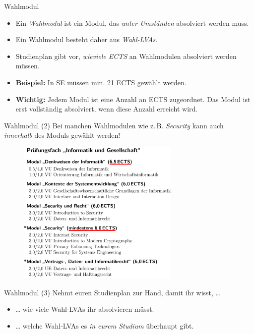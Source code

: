 \documentclass{beamer}
\begin{document}
\begin{frame}{Wahlmodul}
    \begin{itemize}
        \item Ein \textit{Wahlmodul} ist ein Modul, das
              \textit{unter Umständen} absolviert werden muss.
        \item Ein Wahlmodul besteht daher aus \textit{Wahl-LVAs}.
        \item Studienplan gibt vor, \textit{wieviele ECTS} an Wahlmodulen
              absolviert werden müssen.
        \item \textbf{Beispiel:} In SE müssen min. 21 ECTS gewählt werden.
        \item \textbf{Wichtig:} Jedem Modul ist eine Anzahl an ECTS
              zugeordnet. Das Modul ist erst vollständig absolviert, wenn
              diese Anzahl erreicht wird.
    \end{itemize}
\end{frame}

\begin{frame}{Wahlmodul (2)}
    Bei manchen Wahlmodulen wie z.\,B. \textit{Security} kann auch
    \textit{innerhalb} des Moduls gewählt werden!
    \begin{figure}[htp]
        \includegraphics[width=0.7\textwidth]{pruefungsfach2.png}
    \end{figure}
\end{frame}

\begin{frame}{Wahlmodul (3)}
    Nehmt euren Studienplan zur Hand, damit ihr wisst, \ldots
    \begin{itemize}
        \item \ldots{} wie viele Wahl-LVAs ihr absolvieren müsst.
        \item \ldots{} welche Wahl-LVAs es \textit{in eurem Studium} überhaupt
            gibt.
    \end{itemize}
\end{frame}
\end{document}
